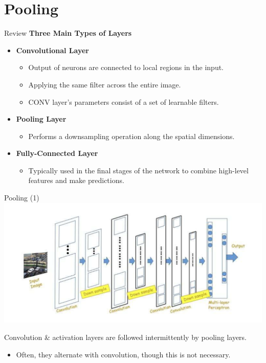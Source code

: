 \documentclass[default, aspectratio=169]{beamer}
\begin{document}
	\section{Pooling}
	\begin{frame}{Review}
		\textbf{Three Main Types of Layers}
		\begin{itemize}
			\item \textbf{Convolutional Layer}
			\begin{itemize}
				\item Output of neurons are connected to local regions in the input.
				\item Applying the same filter across the entire image.
				\item CONV layer’s parameters consist of a set of learnable filters.
			\end{itemize}
			\item \textbf{Pooling Layer}
			\begin{itemize}
				\item Performs a downsampling operation along the spatial dimensions.
			\end{itemize}
			\item \textbf{Fully-Connected Layer}
			\begin{itemize}
				\item Typically used in the final stages of the network to combine high-level features and make predictions.
			\end{itemize}
		\end{itemize}
	\end{frame}
	\begin{frame}{Pooling (1)}
		\centering
		\includegraphics[keepaspectratio, scale=0.5]{pic/pooling.png}
		\smallskip
		\begin{flushleft}
			Convolution \& activation layers are followed intermittently by pooling layers.
			\begin{itemize}
				\item Often, they alternate with convolution, though this is not necessary.
			\end{itemize}
		\end{flushleft}
	\end{frame}
\end{document}

